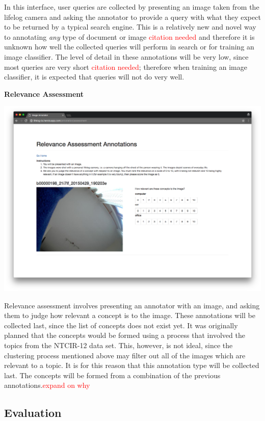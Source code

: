 \documentclass[12pt,a4paper]{article}
\newcommand\todo[1]{\textcolor{red}{#1}}
\begin{document}
In this interface, user queries are collected by presenting an image taken from the lifelog camera and asking the annotator to provide a query with what they expect to be returned by a typical search engine. This is a relatively new and novel way to annotating \textit{any} type of document or image \todo{citation needed} and therefore it is unknown how well the collected queries will perform in search or for training an image classifier. The level of detail in these annotations will be very low, since most queries are very short \todo{citation needed}; therefore when training an image classifier, it is expected that queries will not do very well.

\newpage
\textbf{Relevance Assessment}

\includegraphics[width=\textwidth]{images/rel-ass-interface}

Relevance assessment involves presenting an annotator with an image, and asking them to judge how relevant a concept is to the image. These annotations will be collected last, since the list of concepts does not exist yet. It was originally planned that the concepts would be formed using a process that involved the topics from the NTCIR-12 data set. This, however, is not ideal, since the clustering process mentioned above may filter out all of the images which are relevant to a topic. It is for this reason that this annotation type will be collected last. The concepts will be formed from a combination of the previous annotations.\todo{expand on why}

\subsection{Evaluation}
\end{document}
